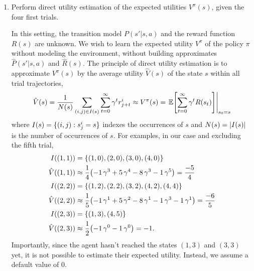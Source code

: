 \documentclass[11pt, a4paper]{article}
\begin{document}
\begin{enumerate}
    \item Perform direct utility estimation of the expected utilities $V^\pi(s)$, given the four first trials.

    \begin{solution}
        In this setting, the transition model $P(s' | s, a)$ and the reward function $R(s)$ are unknown. We wish to learn the expected utility $V^\pi$ of the policy $\pi$ without modeling the environment, \ie{} without building approximates $\hat{P}(s' | s, a)$ and $\hat{R}(s)$. The principle of direct utility estimation is to approximate $V^\pi(s)$ by the average utility $\hat{V}(s)$ of the state $s$ within all trial trajectories, \ie{}
        \begin{equation*}
            \hat{V}(s) = \frac{1}{N(s)} \sum_{(i, j) \in I(s)} \sum_{t = 0}^{\infty} \gamma^t r^i_{j + t} \approx V^\pi(s) = \left. \E \sbk*{\sum_{t = 0}^{\infty} \gamma^t R(s_t)} \right|_{s_0 = s}
        \end{equation*}
        where $I(s) = \{(i, j): s^i_j = s\}$ indexes the occurrences of $s$ and $N(s) = \lvert I(s)\rvert$ is the number of occurrences of $s$. For examples, in our case and excluding the fifth trial,
        \begin{align*}
            I((1, 1)) & = \cbk{(1, 0), (2, 0), (3, 0), (4, 0)} \\
            \hat{V}((1, 1)) & \approx \frac{1}{4} \rbk*{- 1 \, \gamma^3 + 5 \, \gamma^4 - 8 \, \gamma^3 - 1 \, \gamma^5} = \frac{-5}{4} \\
            I((2, 2)) & = \cbk{(1, 2), (2, 2), (3, 2), (4, 2), (4, 4)} \\
            \hat{V}((2, 2)) & \approx \frac{1}{5} \rbk*{- 1 \, \gamma^1 + 5 \, \gamma^2 - 8 \, \gamma^1 - 1 \, \gamma^3 - 1 \, \gamma^1} = \frac{-6}{5} \\
            I((2, 3)) & = \cbk{(1, 3), (4, 5)} \\
            \hat{V}((2, 3)) & \approx \frac{1}{2} \rbk*{- 1 \, \gamma^0 - 1 \, \gamma^0} = -1 .
        \end{align*}
        Importantly, since the agent hasn't reached the states $(1, 3)$ and $(3, 3)$ yet, it is not possible to estimate their expected utility. Instead, we assume a default value of $0$.

        \begin{figure}[h]
            \centering
\end{figure}
\end{solution}
\end{enumerate}
\end{document}
